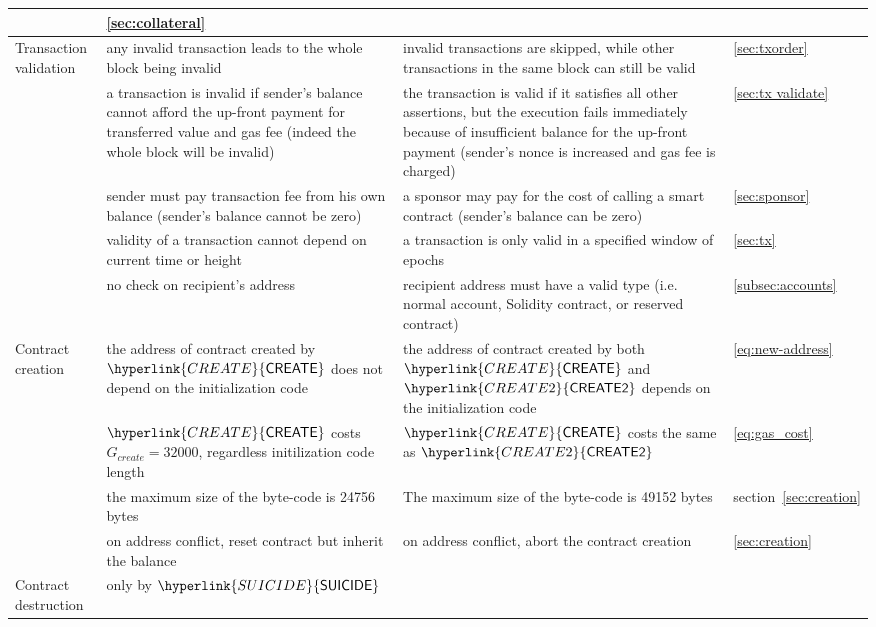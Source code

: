 \documentclass[fleqn,10pt]{SelfArx} %
\begin{document}
\begin{center}
\begin{tabu}{l X X l}
			& \cref{sec:collateral}\\
			\hline
			Transaction validation & 
			{any invalid transaction leads to the whole block being invalid} & 
			{invalid transactions are skipped, while other transactions in the same block can still be valid} & \cref{sec:txorder}\smallskip\\
			& {a transaction is invalid if sender's balance cannot afford the up-front payment for transferred value and gas fee (indeed the whole block will be invalid)} & {the transaction is valid if it satisfies all other assertions, but the execution fails immediately because of insufficient balance for the up-front payment (sender's nonce is increased and gas fee is charged)}	& \cref{sec:tx validate} \\
			& sender must pay transaction fee from his own balance (sender's balance cannot be zero)	& a sponsor may pay for the cost of calling a smart contract (sender's balance can be zero)	& \cref{sec:sponsor} \\
			& validity of a transaction cannot depend on current time or height & a transaction is only valid in a specified window of epochs & \cref{sec:tx} \\
			& no check on recipient's address & recipient address must have a valid type (i.e. normal account, Solidity contract, or reserved contract)  & \cref{subsec:accounts} \\
			\hline
			Contract creation & the address of contract created by $\hyperlink{CREATE}{\op{CREATE}}$ does not depend on the initialization code  &  the address of contract created by both $\hyperlink{CREATE}{\op{CREATE}}$ and $\hyperlink{CREATE2}{\op{CREATE2}}$ depends on the initialization code &  \cref{eq:new-address} \\
			 & 
			$\hyperlink{CREATE}{\op{CREATE}}$ costs $G_{create}=32000$, regardless initilization code length	
			& $\hyperlink{CREATE}{\op{CREATE}}$ costs the same as $\hyperlink{CREATE2}{\op{CREATE2}}$  & \cref{eq:gas_cost} \\
			& the maximum size of the byte-code is 24756 bytes & The maximum size of the byte-code is 49152 bytes & section~\ref{sec:creation}\\
			& on address conflict, reset contract but inherit the balance &  
			on address conflict, abort the contract creation   
			& \cref{sec:creation}  \smallskip\\
			\hline
			Contract destruction & only by $\hyperlink{SUICIDE}{\op{SUICIDE}}$ & 

\end{tabu}
\end{center}
\end{document}
